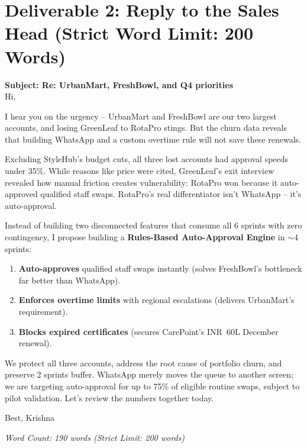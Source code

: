 \documentclass[10pt,a4paper]{article}
\newcommand{\INR}{INR~}
\begin{document}
\section*{Deliverable 2: Reply to the Sales Head (Strict Word Limit: 200 Words)}

\begin{neutralcard}
\footnotesize
\textbf{Subject: Re: UrbanMart, FreshBowl, and Q4 priorities}\\
Hi,

I hear you on the urgency -- UrbanMart and FreshBowl are our two largest accounts, and losing GreenLeaf to RotaPro stings. But the churn data reveals that building WhatsApp and a custom overtime rule will not save these renewals.

Excluding StyleHub's budget cuts, all three lost accounts had approval speeds under 35\%. While reasons like price were cited, GreenLeaf's exit interview revealed how manual friction creates vulnerability: RotaPro won because it auto-approved qualified staff swaps. RotaPro's real differentiator isn't WhatsApp -- it's auto-approval.

Instead of building two disconnected features that consume all 6 sprints with zero contingency, I propose building a \textbf{Rules-Based Auto-Approval Engine} in $\sim$4 sprints:
\begin{enumerate}[leftmargin=12pt,itemsep=0.8pt,topsep=0.8pt]
    \item \textbf{Auto-approves} qualified staff swaps instantly (solves FreshBowl's bottleneck far better than WhatsApp).
    \item \textbf{Enforces overtime limits} with regional escalations (delivers UrbanMart's requirement).
    \item \textbf{Blocks expired certificates} (secures CarePoint's \INR 60L December renewal).
\end{enumerate}
We protect all three accounts, address the root cause of portfolio churn, and preserve 2 sprints buffer. WhatsApp merely moves the queue to another screen; we are targeting auto-approval for up to 75\% of eligible routine swaps, subject to pilot validation. Let's review the numbers together today.

Best, \quad Krishna
\end{neutralcard}
\vspace{-2mm}
\begin{flushright}
\scriptsize\textit{Word Count: 190 words (Strict Limit: 200 words)}
\end{flushright}
\end{document}
